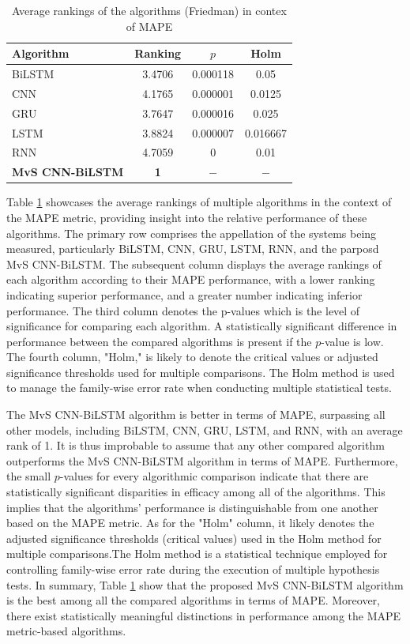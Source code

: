 \documentclass[a4paper,fleqn]{cas-sc}
\begin{document}
    \begin{table}[!htp]
      \caption{Average rankings of the algorithms (Friedman) in contex of MAPE}
      \centering
      \begin{tabular}{lccc}\hline
      Algorithm&Ranking&$p$&Holm\\\hline
      BiLSTM&3.4706&0.000118&0.05\\
      CNN&4.1765&0.000001&0.0125\\
      GRU&3.7647&0.000016&0.025\\
      LSTM&3.8824&0.000007&0.016667\\
      RNN&4.7059&0&0.01\\
      \textbf{MvS CNN-BiLSTM}&\textbf{1}&$-$ &$-$\\\hline
    \end{tabular}
      
      \label{rank_mape}
      \end{table}
      Table \ref{rank_mape} showcases the average rankings of multiple algorithms in the context of the MAPE metric, providing insight into the relative performance of these algorithms. The primary row comprises the appellation of the systems being measured, particularly BiLSTM, CNN, GRU, LSTM, RNN, and the parposd MvS CNN-BiLSTM. The subsequent column displays the average rankings of each algorithm according to their MAPE performance, with a lower ranking indicating superior performance, and a greater number indicating inferior performance. The third column denotes the p-values which is the level of significance for comparing each algorithm. A statistically significant difference in performance between the compared algorithms is present if the $p$-value is low. The fourth column, "Holm," is likely to denote the critical values or adjusted significance thresholds used for multiple comparisons. The Holm method is used to manage the family-wise error rate when conducting multiple statistical tests.
      
      The MvS CNN-BiLSTM algorithm is better in terms of MAPE, surpassing all other models, including BiLSTM, CNN, GRU, LSTM, and RNN, with an average rank of 1. It is thus improbable to assume that any other compared algorithm outperforms the MvS CNN-BiLSTM algorithm in terms of MAPE. Furthermore, the small $p$-values for every algorithmic comparison indicate that there are statistically significant disparities in efficacy among all of the algorithms. This implies that the algorithms' performance is distinguishable from one another based on the MAPE metric. As for the "Holm" column, it likely denotes the adjusted significance thresholds (critical values) used in the Holm method for multiple comparisons.The Holm method is a statistical technique employed for controlling family-wise error rate during the execution of multiple hypothesis tests. In summary, Table \ref{rank_mape} show that the proposed MvS CNN-BiLSTM algorithm is the best among all the compared algorithms in terms of MAPE. Moreover, there exist statistically meaningful distinctions in performance among the MAPE metric-based algorithms.
    
\end{document}
